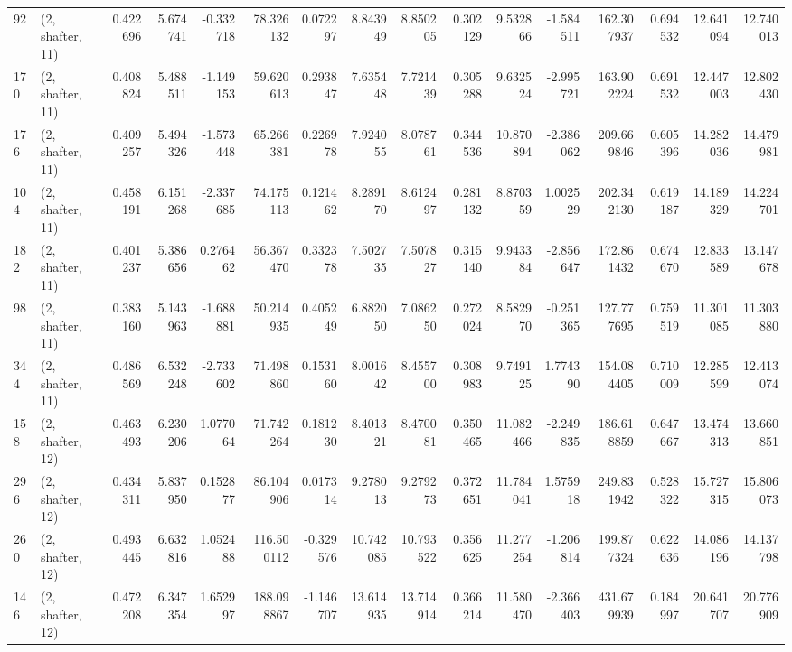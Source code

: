 \begin{tabular}{llrrrrrrrrrrrrrr}
92  &  (2, shafter, 11) &   0.422696 &   5.674741 &  -0.332718 &    78.326132 &   0.072297 &   8.843949 &   8.850205 &  0.302129 &   9.532866 &  -1.584511 &    162.307937 &    0.694532 &   12.641094 &   12.740013 \\
170 &  (2, shafter, 11) &   0.408824 &   5.488511 &  -1.149153 &    59.620613 &   0.293847 &   7.635448 &   7.721439 &  0.305288 &   9.632524 &  -2.995721 &    163.902224 &    0.691532 &   12.447003 &   12.802430 \\
176 &  (2, shafter, 11) &   0.409257 &   5.494326 &  -1.573448 &    65.266381 &   0.226978 &   7.924055 &   8.078761 &  0.344536 &  10.870894 &  -2.386062 &    209.669846 &    0.605396 &   14.282036 &   14.479981 \\
104 &  (2, shafter, 11) &   0.458191 &   6.151268 &  -2.337685 &    74.175113 &   0.121462 &   8.289170 &   8.612497 &  0.281132 &   8.870359 &   1.002529 &    202.342130 &    0.619187 &   14.189329 &   14.224701 \\
182 &  (2, shafter, 11) &   0.401237 &   5.386656 &   0.276462 &    56.367470 &   0.332378 &   7.502735 &   7.507827 &  0.315140 &   9.943384 &  -2.856647 &    172.861432 &    0.674670 &   12.833589 &   13.147678 \\
98  &  (2, shafter, 11) &   0.383160 &   5.143963 &  -1.688881 &    50.214935 &   0.405249 &   6.882050 &   7.086250 &  0.272024 &   8.582970 &  -0.251365 &    127.777695 &    0.759519 &   11.301085 &   11.303880 \\
344 &  (2, shafter, 11) &   0.486569 &   6.532248 &  -2.733602 &    71.498860 &   0.153160 &   8.001642 &   8.455700 &  0.308983 &   9.749125 &   1.774390 &    154.084405 &    0.710009 &   12.285599 &   12.413074 \\
158 &  (2, shafter, 12) &   0.463493 &   6.230206 &   1.077064 &    71.742264 &   0.181230 &   8.401321 &   8.470081 &  0.350465 &  11.082466 &  -2.249835 &    186.618859 &    0.647667 &   13.474313 &   13.660851 \\
296 &  (2, shafter, 12) &   0.434311 &   5.837950 &   0.152877 &    86.104906 &   0.017314 &   9.278013 &   9.279273 &  0.372651 &  11.784041 &   1.575918 &    249.831942 &    0.528322 &   15.727315 &   15.806073 \\
260 &  (2, shafter, 12) &   0.493445 &   6.632816 &   1.052488 &   116.500112 &  -0.329576 &  10.742085 &  10.793522 &  0.356625 &  11.277254 &  -1.206814 &    199.877324 &    0.622636 &   14.086196 &   14.137798 \\
146 &  (2, shafter, 12) &   0.472208 &   6.347354 &   1.652997 &   188.098867 &  -1.146707 &  13.614935 &  13.714914 &  0.366214 &  11.580470 &  -2.366403 &    431.679939 &    0.184997 &   20.641707 &   20.776909 \\

\end{tabular}
